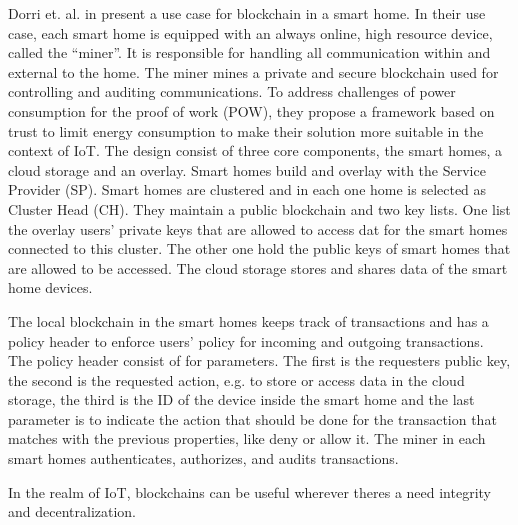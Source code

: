 Dorri et. al. in \cite{Dorri2017SmartHome} present a use case for blockchain in a smart home. In their use case, each smart home is equipped with an always online, high resource device, called the ``miner''. It is responsible for handling all communication within and external to the home.
The miner mines a private and secure blockchain used for controlling and auditing communications. To address challenges of power consumption for the proof of work (POW), they propose a framework based on trust to limit energy consumption to make their solution more suitable in the context of IoT.
The design consist of three core components, the smart homes, a cloud storage and an overlay.
Smart homes build and overlay with the Service Provider (SP). Smart homes are clustered and in each one home is selected as Cluster Head (CH).
They maintain a public blockchain and two key lists. One list the overlay users' private keys that are allowed to access dat for the smart homes connected to this cluster.
The other one hold the public keys of smart homes that are allowed to be accessed.
The cloud storage stores and shares data of the smart home devices.

The local blockchain in the smart homes keeps track of transactions and has a policy header to enforce users' policy for incoming and outgoing transactions.
The policy header consist of for parameters. The first is the requesters public key, the second is the requested action, e.g. to store or access data in the cloud storage, the third is the ID of the device inside the smart home 
and the last parameter is to indicate the action that should be done for the transaction that matches with the previous properties, like deny or allow it.
The miner in each smart homes authenticates, authorizes, and audits transactions.


In the realm of IoT, blockchains can be useful wherever theres a need integrity and decentralization.









